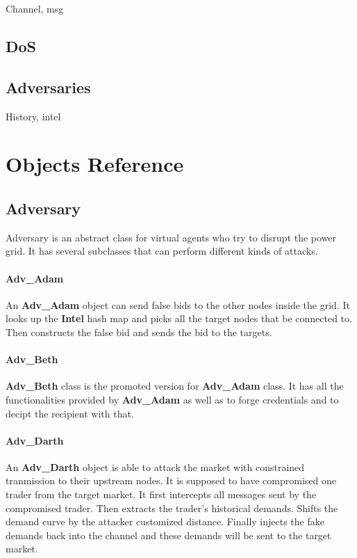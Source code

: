 \documentclass[12pt]{article}
\begin{document}
Channel, msg 

\subsection{DoS}

\subsection{Adversaries}

History, intel

\section{Objects Reference}

\subsection{Adversary} \mbox{}

Adversary is an abstract class for virtual agents who try to disrupt the
power grid. It has several subclasses that can perform different
kinds of attacks.

\paragraph{Adv\_Adam} \mbox{}

An \textbf{Adv\_Adam} object can send false bids to the other nodes inside the grid. 
It looks up the \textbf{Intel} hash map and picks all the target nodes that be 
connected to. Then constructs the false bid and sends the bid to the targets.

\paragraph{Adv\_Beth} \mbox{}

\textbf{Adv\_Beth} class is the promoted version for \textbf{Adv\_Adam} class. It has all 
the functionalities provided by \textbf{Adv\_Adam} as well as to forge credentials 
and to decipt the recipient with that.

\paragraph{Adv\_Darth} \mbox{}

An \textbf{Adv\_Darth} object is able to attack the market with constrained tranmission 
to their upstream nodes. It is supposed to have compromised one trader from the 
target market. It first intercepts all messages sent by the compromised trader. 
Then extracts the trader's historical demands. Shifts the demand curve by the attacker 
customized distance. Finally injects the fake demands back into the channel and these 
demands will be sent to the target market. 
\end{document}
